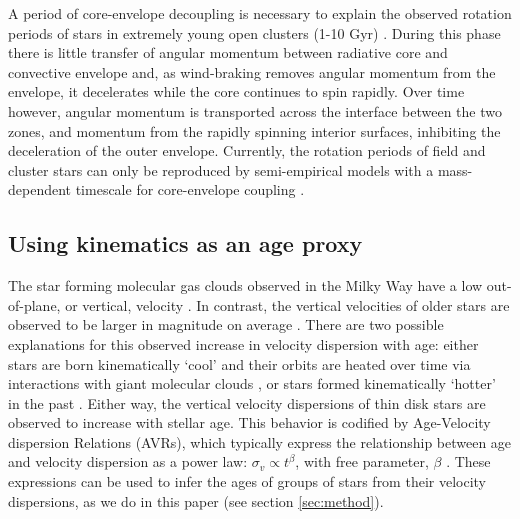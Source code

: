 A period of core-envelope decoupling is necessary to explain the observed
rotation periods of stars in extremely young open clusters (1-10 Gyr)
\citep[\eg][]{irwin2007, bouvier2008, denissenkov2010, spada2011, reiners2012,
gallet2013}.
During this phase there is little transfer of angular momentum between
radiative core and convective envelope and, as wind-braking removes angular
momentum from the envelope, it decelerates while the core continues to spin
rapidly.
Over time however, angular momentum is transported across the interface
between the two zones, and momentum from the rapidly spinning interior
surfaces, inhibiting the deceleration of the outer envelope.
Currently, the rotation periods of field and cluster stars can only be
reproduced by semi-empirical models with a mass-dependent timescale for
core-envelope coupling \citep[][Angus \etal, 2020]{spada2019, curtis2019}.


\subsection{Using kinematics as an age proxy}

The star forming molecular gas clouds observed in the Milky Way have a low
out-of-plane, or vertical, velocity \citep[\eg][]{stark1989, stark2005,
aumer2009, martig2014, aumer2016}.
In contrast, the vertical velocities of older stars are observed to be larger
in magnitude on average \citep{stromberg1946, wielen1977, nordstrom2004,
holmberg2007, holmberg2009, aumer2009, casagrande2011, ting2019, yu2018}.
There are two possible explanations for this observed increase in velocity
dispersion with age: either stars are born kinematically `cool' and their
orbits are heated over time via interactions with giant molecular clouds
\citep[see][for a review of secular evolution in the MW]{sellwood2014}, or
stars formed kinematically `hotter' in the past \citep[\eg][]{bird2013}.
Either way, the vertical velocity dispersions of thin disk stars are observed
to increase with stellar age.
This behavior is codified by Age-Velocity dispersion Relations (AVRs), which
typically express the relationship between age and velocity dispersion as a
power law: $\sigma_v \propto t^\beta$, with free parameter, $\beta$
\citep[\eg][]{holmberg2009, yu2018}.
These expressions can be used to infer the ages of groups of stars from their
velocity dispersions, as we do in this paper (see section \ref{sec:method}).

